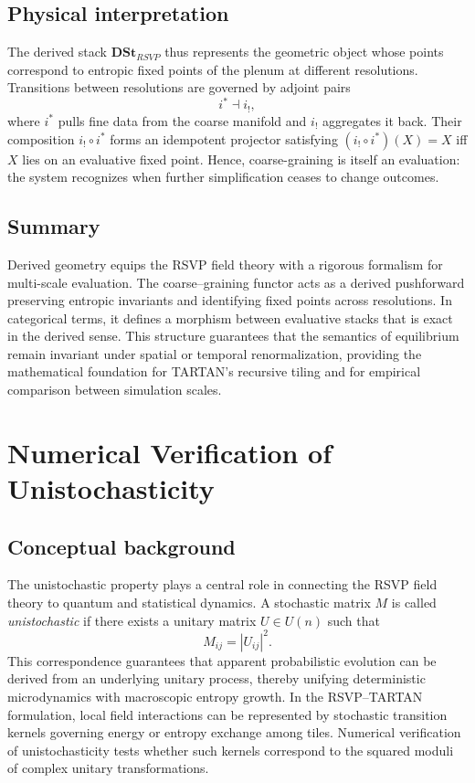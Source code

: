 \documentclass[12pt,a4paper]{article}
\newcommand{\RSVP}{RSVP}              %
\theoremstyle{plain}
\begin{document}
\subsection{Physical interpretation}
The derived stack \(\mathbf{DSt}_{\RSVP}\) thus represents the geometric object whose points correspond to entropic fixed points of the plenum at different resolutions.
Transitions between resolutions are governed by adjoint pairs
\[
i^* \dashv i_! ,
\]
where \(i^*\) pulls fine data from the coarse manifold and \(i_!\) aggregates it back.
Their composition \(i_!\circ i^*\) forms an idempotent projector satisfying
\((i_!\circ i^*)(X)=X\)
iff \(X\) lies on an evaluative fixed point.  
Hence, coarse-graining is itself an evaluation: the system recognizes when further simplification ceases to change outcomes.

\subsection{Summary}
Derived geometry equips the RSVP field theory with a rigorous formalism for multi-scale evaluation.  
The coarse--graining functor acts as a derived pushforward preserving entropic invariants and identifying fixed points across resolutions.  
In categorical terms, it defines a morphism between evaluative stacks that is exact in the derived sense.
This structure guarantees that the semantics of equilibrium remain invariant under spatial or temporal renormalization, providing the mathematical foundation for TARTAN’s recursive tiling and for empirical comparison between simulation scales.



\section{Numerical Verification of Unistochasticity}
\label{app:unistochasticity}

\subsection{Conceptual background}
The unistochastic property plays a central role in connecting the RSVP field theory to quantum and statistical dynamics.  
A stochastic matrix \(M\) is called \emph{unistochastic} if there exists a unitary matrix \(U\in U(n)\) such that 
\[
M_{ij}=|U_{ij}|^2.
\]
This correspondence guarantees that apparent probabilistic evolution can be derived from an underlying unitary process, thereby unifying deterministic microdynamics with macroscopic entropy growth.
In the RSVP--TARTAN formulation, local field interactions can be represented by stochastic transition kernels governing energy or entropy exchange among tiles.  
Numerical verification of unistochasticity tests whether such kernels correspond to the squared moduli of complex unitary transformations.
\end{document}
